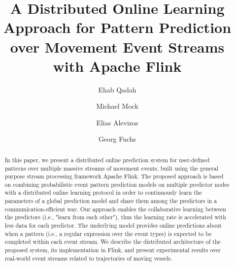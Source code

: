 \documentclass[sigconf,edbt]{acmart-edbt-workshops}
\begin{document}
\title{A Distributed Online Learning Approach for Pattern Prediction over Movement Event Streams with Apache Flink}

%
  
\author{Ehab Qadah}

\author{Michael Mock}


\author{Elias Alevizos}

\author{Georg Fuchs}

\renewcommand{\shortauthors}{}


\begin{abstract}
In this paper, we present a distributed online prediction system for user-defined patterns over multiple massive streams of movement events, built using the general purpose stream processing framework Apache Flink. The proposed approach is based on combining probabilistic event pattern prediction models on multiple predictor nodes with a distributed online learning protocol in order to continuously learn the parameters of a global prediction model and share them among the predictors in a communication-efficient way. Our approach enables the  collaborative learning between the predictors (i.e., "learn from each other"), thus the learning rate is accelerated with less data for each predictor. The underlying model provides online predictions about when a pattern (i.e., a regular expression over the event types) is expected to be completed within each event stream. We describe the distributed architecture of the proposed system, its implementation in Flink, and present experimental results over real-world event streams related to trajectories of moving vessels.

\end{abstract}
\end{document}
